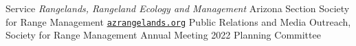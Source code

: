 \begin{rubric}{Service}
%
    \emph{Rangelands, Rangeland Ecology and Management}
%
    Arizona Section Society for Range Management {\faGlobe}{\href{https://azrangelands.org/}{\texttt{azrangelands.org}}}
%
    Public Relations and Media Outreach, Society for Range Management Annual Meeting 2022 Planning Committee
%
\end{rubric}